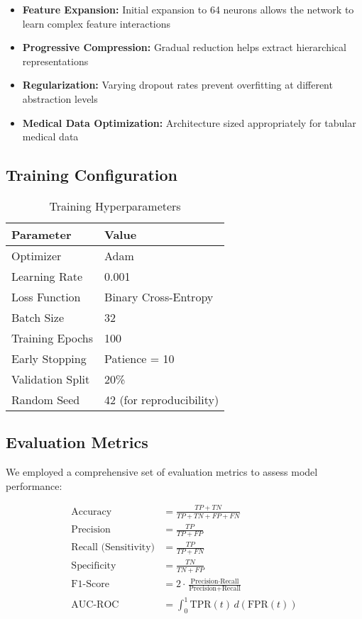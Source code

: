 \documentclass[12pt,a4paper]{article}
\begin{document}
\begin{itemize}
    \item \textbf{Feature Expansion:} Initial expansion to 64 neurons allows the network to learn complex feature interactions
    \item \textbf{Progressive Compression:} Gradual reduction helps extract hierarchical representations
    \item \textbf{Regularization:} Varying dropout rates prevent overfitting at different abstraction levels
    \item \textbf{Medical Data Optimization:} Architecture sized appropriately for tabular medical data
\end{itemize}

\subsection{Training Configuration}

\begin{table}[H]
\centering
\caption{Training Hyperparameters}
\label{tab:training_params}
\begin{tabular}{@{}ll@{}}
\toprule
\textbf{Parameter} & \textbf{Value} \\
\midrule
Optimizer & Adam \\
Learning Rate & 0.001 \\
Loss Function & Binary Cross-Entropy \\
Batch Size & 32 \\
Training Epochs & 100 \\
Early Stopping & Patience = 10 \\
Validation Split & 20\% \\
Random Seed & 42 (for reproducibility) \\
\bottomrule
\end{tabular}
\end{table}

\subsection{Evaluation Metrics}

We employed a comprehensive set of evaluation metrics to assess model performance:

\begin{align}
\text{Accuracy} &= \frac{TP + TN}{TP + TN + FP + FN} \\
\text{Precision} &= \frac{TP}{TP + FP} \\
\text{Recall (Sensitivity)} &= \frac{TP}{TP + FN} \\
\text{Specificity} &= \frac{TN}{TN + FP} \\
\text{F1-Score} &= 2 \cdot \frac{\text{Precision} \cdot \text{Recall}}{\text{Precision} + \text{Recall}} \\
\text{AUC-ROC} &= \int_0^1 \text{TPR}(t) \, d(\text{FPR}(t))
\end{align}
\end{document}
